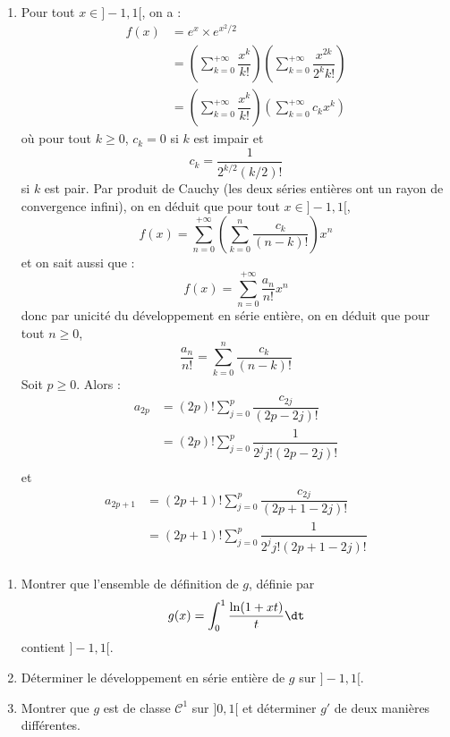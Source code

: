 \documentclass[a4paper,10pt]{report}
\begin{document}
\begin{enumerate}
\item Pour tout $x \in ]-1,1[$, on a :
\begin{align*}
f(x) & = e^x \times e^{x^2/2} \\
& = \left( \sum_{k=0}^{+ \infty} \dfrac{x^k}{k!} \right) \left( \sum_{k=0}^{+ \infty} \dfrac{x^{2k}}{2^k k!} \right)  \\
& = \left( \sum_{k=0}^{+ \infty} \dfrac{x^k}{k!} \right) \left( \sum_{k=0}^{+ \infty} c_k x^k \right)  
\end{align*}
où pour tout $k \geq 0$, $c_k=0$ si $k$ est impair et 
$$ c_k = \dfrac{1}{2^{k/2} (k/2)!}$$
si $k$ est pair. Par produit de Cauchy (les deux séries entières ont un rayon de convergence infini), on en déduit que pour tout $x \in ]-1,1[$,
$$ f(x) = \sum_{n=0}^{+ \infty} \left(\sum_{k=0}^n \dfrac{c_k}{(n-k)!} \right) x^n$$
et on sait aussi que :
$$ f(x) = \sum_{n=0}^{+ \infty} \dfrac{a_n}{n!} x^n$$
donc par unicité du développement en série entière, on en déduit que pour tout $n \geq 0$,
$$\dfrac{a_n}{n!} = \sum_{k=0}^n \dfrac{c_k}{(n-k)!}$$
Soit $p \geq 0$. Alors :
\begin{align*}
a_{2p} & = (2p)! \sum_{j=0}^p \dfrac{c_{2j}}{(2p-2j)!} \\
& = (2p)! \sum_{j=0}^p \dfrac{1}{2^j j! (2p-2j)!} \\
\end{align*}
et 
\begin{align*}
a_{2p+1} & = (2p+1)! \sum_{j=0}^p \dfrac{c_{2j}}{(2p+1-2j)!} \\
& = (2p+1)! \sum_{j=0}^p \dfrac{1}{2^j j! (2p+1-2j)!} \\
\end{align*}
\end{enumerate}


\begin{Exa} \begin{enumerate}
\item Montrer que l'ensemble de définition de $g$, définie par 
$$ g(x) = \int_{0}^1 \dfrac{\ln(1+xt)}{t} \dt$$
contient $]-1,1[$.
\item Déterminer le développement en série entière de $g$ sur $]-1,1[$.
\item Montrer que $g$ est de classe $\mathcal{C}^1$ sur $]0,1[$ et déterminer $g'$ de deux manières différentes.
\end{enumerate}
\end{Exa}
\end{document}
